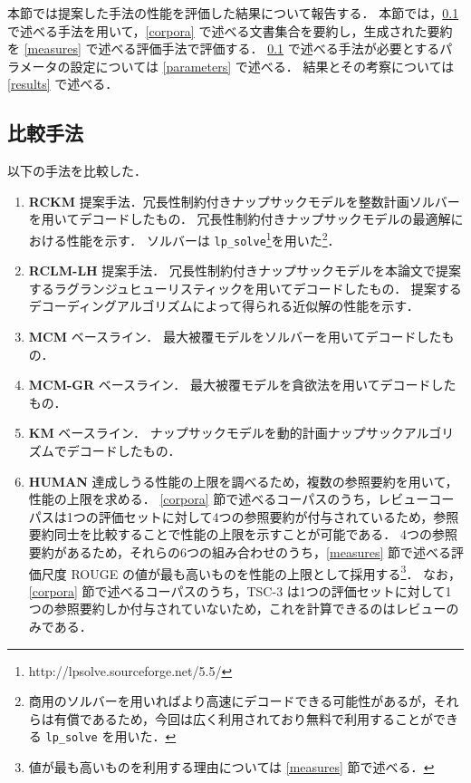\documentclass[japanese]{jnlp_1.4}
\begin{document}
本節では提案した手法の性能を評価した結果について報告する．
本節では，\ref{methods} で述べる手法を用いて，\ref{corpora} で述べる文書集合を要約し，生成された要約を \ref{measures} で述べる評価手法で評価する．
\ref{methods} で述べる手法が必要とするパラメータの設定については \ref{parameters} で述べる．
結果とその考察については \ref{results} で述べる．


\subsection{比較手法}\label{methods}
以下の手法を比較した．

\begin{enumerate}
\item {\bf RCKM}\hspace{1zw}
提案手法．冗長性制約付きナップサックモデルを整数計画ソルバーを用いてデコードしたもの．
冗長性制約付きナップサックモデルの最適解における性能を示す．
ソルバーは {\tt lp\_solve}\footnote{http://lpsolve.sourceforge.net/5.5/}を用いた\footnote{商用のソルバーを用いればより高速にデコードできる可能性があるが，それらは有償であるため，今回は広く利用されており無料で利用することができる {\tt lp\_solve} を用いた．}．
\item {\bf RCLM-LH}\hspace{1zw}
提案手法．
冗長性制約付きナップサックモデルを本論文で提案するラグランジュヒューリスティックを用いてデコードしたもの．
提案するデコーディングアルゴリズムによって得られる近似解の性能を示す．
\item {\bf MCM}\hspace{1zw}
ベースライン．
最大被覆モデルをソルバーを用いてデコードしたもの．
\item {\bf MCM-GR}\hspace{1zw}
ベースライン．
最大被覆モデルを貪欲法を用いてデコードしたもの．
\item {\bf KM}\hspace{1zw}
ベースライン．
ナップサックモデルを動的計画ナップサックアルゴリズムでデコードしたもの．
\item {\bf HUMAN}\hspace{1zw}
達成しうる性能の上限を調べるため，複数の参照要約を用いて，性能の上限を求める．
\ref{corpora} 節で述べるコーパスのうち，レビューコーパスは1つの評価セットに対して4つの参照要約が付与されているため，参照要約同士を比較することで性能の上限を示すことが可能である．
4つの参照要約があるため，それらの6つの組み合わせのうち，\ref{measures} 節で述べる評価尺度 ROUGE の値が最も高いものを性能の上限として採用する\footnote{値が最も高いものを利用する理由については \ref{measures} 節で述べる．}．
なお，\ref{corpora} 節で述べるコーパスのうち，TSC-3 は1つの評価セットに対して1つの参照要約しか付与されていないため，これを計算できるのはレビューのみである．
\end{enumerate}
\end{document}
